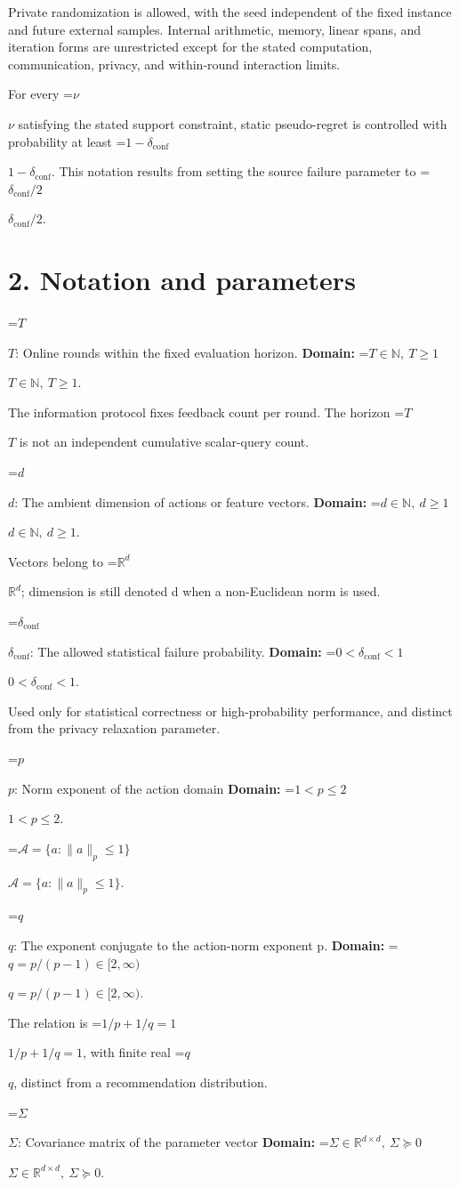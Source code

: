 \documentclass[10pt,a4paper]{article}
\newcommand{\AtlasMath}[1]{\par\begingroup\centering\setbox0=\hbox{$\displaystyle #1$}\ifdim\wd0>1.4\linewidth\typeout{ATLAS WIDE FORMULA: \the\wd0}\fi\ifdim\wd0>\linewidth\resizebox{\linewidth}{!}{\box0}\else\box0\fi\par\endgroup}
\newcommand{\AtlasInlineMath}[1]{\begingroup\setbox0=\hbox{$#1$}\ifdim\wd0>.4\linewidth\endgroup\AtlasMath{#1}\else\endgroup$#1$\fi}
\begin{document}
Private randomization is allowed, with the seed independent of the fixed instance and future external samples. Internal arithmetic, memory, linear spans, and iteration forms are unrestricted except for the stated computation, communication, privacy, and within-round interaction limits.

For every \AtlasInlineMath{\nu} satisfying the stated support constraint, static pseudo-regret is controlled with probability at least \AtlasInlineMath{1-\delta_{\mathrm{conf}}}. This notation results from setting the source failure parameter to \AtlasInlineMath{\delta_{\mathrm{conf}}/2}.

\section{2. Notation and parameters}
\AtlasInlineMath{T}: Online rounds within the fixed evaluation horizon. \textbf{Domain:} \AtlasInlineMath{T\in\mathbb N,\ T\ge1}.

The information protocol fixes feedback count per round. The horizon \AtlasInlineMath{T} is not an independent cumulative scalar-query count.

\AtlasInlineMath{d}: The ambient dimension of actions or feature vectors. \textbf{Domain:} \AtlasInlineMath{d\in\mathbb N,\ d\ge1}.

Vectors belong to \AtlasInlineMath{\mathbb R^d}; dimension is still denoted d when a non-Euclidean norm is used.

\AtlasInlineMath{\delta_{\mathrm{conf}}}: The allowed statistical failure probability. \textbf{Domain:} \AtlasInlineMath{0<\delta_{\mathrm{conf}}<1}.

Used only for statistical correctness or high-probability performance, and distinct from the privacy relaxation parameter.

\AtlasInlineMath{p}: Norm exponent of the action domain \textbf{Domain:} \AtlasInlineMath{1<p\le2}.

\AtlasInlineMath{\mathcal A=\{a:\|a\|_p\le1\}}.

\AtlasInlineMath{q}: The exponent conjugate to the action-norm exponent p. \textbf{Domain:} \AtlasInlineMath{q=p/(p-1)\in[2,\infty)}.

The relation is \AtlasInlineMath{1/p+1/q=1}, with finite real \AtlasInlineMath{q}, distinct from a recommendation distribution.

\AtlasInlineMath{\Sigma}: Covariance matrix of the parameter vector \textbf{Domain:} \AtlasInlineMath{\Sigma\in\mathbb R^{d\times d},\ \Sigma\succeq0}.
\end{document}
